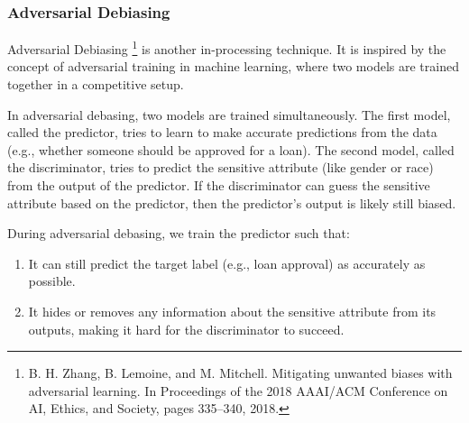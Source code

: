 \begin{VCSet}
    \begin{visualComponent}
    \end{visualComponent}
    
    \begin{visualComponent}
    \end{visualComponent}
\end{VCSet}

\subsubsection{Adversarial Debiasing}
Adversarial Debiasing \footnote{B. H. Zhang, B. Lemoine, and M. Mitchell. Mitigating unwanted biases with adversarial learning. In Proceedings of the 2018 AAAI/ACM Conference on AI, Ethics, and Society, pages 335–340, 2018.} is another in-processing technique. It is inspired by the concept of adversarial training in machine learning, where two models are trained together in a competitive setup.
\par In adversarial debasing, two models are trained simultaneously. The first model, called the predictor, tries to learn to make accurate predictions from the data (e.g., whether someone should be approved for a loan). The second model, called the discriminator, tries to predict the sensitive attribute (like gender or race) from the output of the predictor. If the discriminator can guess the sensitive attribute based on the predictor, then the predictor’s output is likely still biased.
\par During adversarial debasing, we train the predictor such that:
\begin{enumerate}
\item It can still predict the target label (e.g., loan approval) as accurately as possible.
\item It hides or removes any information about the sensitive attribute from its outputs, making it hard for the discriminator to succeed.
\end{enumerate}

